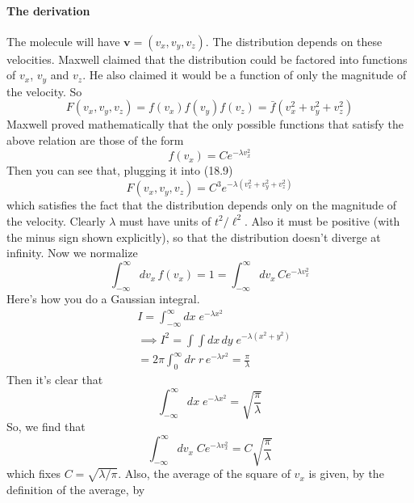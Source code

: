\documentclass{report}
\numberwithin{equation}{section}
\begin{document}
\paragraph{The derivation} The molecule will have $\mathbf{v}=(v_x,v_y,v_z)$. The distribution depends on these velocities. Maxwell claimed that the distribution could be factored into functions of $v_x$, $v_y$ and $v_z$. He also claimed it would be a function of only the magnitude of the velocity. So
\begin{equation}
    F(v_x,v_y,v_z) = f(v_x)f(v_y)f(v_z) = \bar{f}\left(v_x^2 + v_y^2 + v_z^2\right)
\end{equation}
Maxwell proved mathematically that the only possible functions that satisfy the above relation are those of the form
\begin{equation}
    f(v_x) = Ce^{-\lambda v_x^2}
\end{equation}
Then you can see that, plugging it into (18.9)
\begin{equation}
    F(v_x,v_y,v_z) = C^3 e^{-\lambda (v_x^2 + v_y^2 + v_z^2)}
\end{equation}
which satisfies the fact that the distribution depends only on the magnitude of the velocity. Clearly $\lambda$ must have units of $t^2/\ell^2$. Also it must be positive (with the minus sign shown explicitly), so that the distribution doesn't diverge at infinity. Now we normalize
\begin{equation*}
    \int^{\infty}_{-\infty}dv_x\,f(v_x) = 1 = \int^{\infty}_{-\infty} dv_x\, Ce^{-\lambda v_x^2}
\end{equation*}
Here's how you do a Gaussian integral.
\begin{align*}
    &I = \int^{\infty}_{-\infty}dx\; e^{-\lambda x^2}\\
    &\implies I^2 = \int\int dx\, dy\; e^{-\lambda (x^2 + y^2)}\\
    &= 2\pi \int^{\infty}_0 dr\; r\, e^{-\lambda r^2} = \frac{\pi}{\lambda}
\end{align*}
Then it's clear that
\begin{equation}
    \int^{\infty}_{-\infty} dx\; e^{-\lambda x^2} = \sqrt{\frac{\pi}{\lambda}}
\end{equation}
So, we find that
\begin{equation}
    \int^{\infty}_{-\infty} dv_x\; Ce^{-\lambda v_x^2} = C\sqrt{\frac{\pi}{\lambda}}
\end{equation}
which fixes $C = \sqrt{\lambda/\pi}$. Also, the average of the square of $v_x$ is given, by the definition of the average, by
\end{document}
